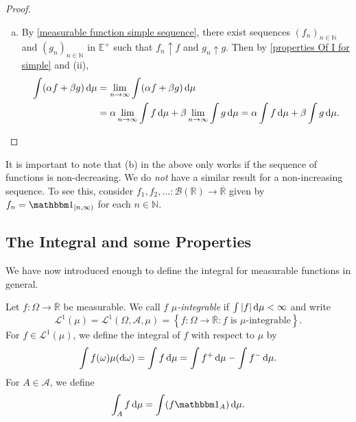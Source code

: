 \begin{proof}
\begin{enumerate}[(a)]
        Now,
        $$\int f_n\d{\mu} \geq \int tg\indic_{A_n}\d{\mu}$$
        Taking the limit as $n\to\infty$ and $t\to 1$, we have
        $$\lim_{n\to\infty}\int f_n\d{\mu}\geq \int g\d{\mu}.$$
        This completes the proof.
        
        \item By \cref{measurable function simple sequence}, there exist sequences $(f_n)_{n\in\mathbb{N}}$ and $(g_n)_{n\in\mathbb{N}}$ in $\mathbb{E}^+$ such that $f_n\uparrow f$ and $g_n\uparrow g$. Then by \cref{properties Of I for simple} and (ii),
        \begin{align*}
            \int (\alpha f+\beta g)\operatorname{d}\!{\mu} &= \lim_{n\to\infty} \int(\alpha f+\beta g)\operatorname{d}\!{\mu} \\
            &= \alpha \lim_{n\to\infty} \int f\operatorname{d}\!{\mu} + \beta \lim_{n\to\infty} \int g\operatorname{d}\!{\mu} = \alpha\int f\operatorname{d}\!{\mu} + \beta\int g\operatorname{d}\!{\mu}.
        \end{align*}
    \end{enumerate}
\end{proof}


It is important to note that (b) in the above only works if the sequence of functions is non-decreasing. We do \textit{not} have a similar result for a non-increasing sequence. To see this, consider $f_1,f_2,\ldots:\mathcal{B}(\mathbb{R})\to\overline{\mathbb{R}}$ given by $f_n=\indic_{[n,\infty)}$ for each $n\in\mathbb{N}$.

    

\subsection{The Integral and some Properties}

We have now introduced enough to define the integral for measurable functions in general.

\begin{fdef}
\label{defIntegral}
    Let $f:\Omega\to\overline{\mathbb{R}}$ be measurable. We call $f$ \textit{$\mu$-integrable} if $\int |f|\operatorname{d}\!{\mu}<\infty$ and write
    $$\mathcal{L}^1(\mu)=\mathcal{L}^1(\Omega,\mathcal{A},\mu)=\left\{f:\Omega\to\overline{\mathbb{R}}:f\text{ is }\mu\text{-integrable}\right\}.$$
    For $f\in\mathcal{L}^1(\mu)$, we define the integral of $f$ with respect to $\mu$ by
    $$\int f(\omega)\mu(\operatorname{d}\!{\omega})=\int f\operatorname{d}\!{\mu}=\int f^+\operatorname{d}\!{\mu} - \int f^-\operatorname{d}\!{\mu}.$$
    For $A\in\mathcal{A}$, we define
    $$\int_A f\d{\mu} = \int (f\indic_A)\d{\mu}.$$
\end{fdef}

